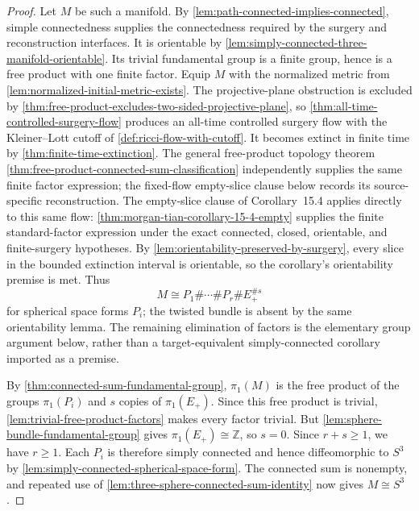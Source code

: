 \begin{proof}
Let $M$ be such a manifold.  By
\ref{lem:path-connected-implies-connected}, simple connectedness supplies the
connectedness required by the surgery and reconstruction interfaces.  It is
orientable by
\ref{lem:simply-connected-three-manifold-orientable}.  Its trivial
fundamental group is a finite group, hence is a free product with one finite
factor.  Equip $M$ with the normalized metric from
\ref{lem:normalized-initial-metric-exists}.  The projective-plane obstruction
is excluded by \ref{thm:free-product-excludes-two-sided-projective-plane}, so
  \ref{thm:all-time-controlled-surgery-flow} produces an all-time controlled
  surgery flow with the Kleiner--Lott cutoff of
  \ref{def:ricci-flow-with-cutoff}.  It becomes extinct in finite time by
  \ref{thm:finite-time-extinction}.  The general free-product topology theorem
\ref{thm:free-product-connected-sum-classification} independently supplies
the same finite factor expression; the fixed-flow empty-slice clause below
records its source-specific reconstruction.  The empty-slice clause of
Corollary~15.4
applies directly to this same flow:
\ref{thm:morgan-tian-corollary-15-4-empty} supplies the finite standard-factor
expression under the exact connected, closed, orientable, and finite-surgery
hypotheses.  By
\ref{lem:orientability-preserved-by-surgery}, every slice in the bounded
extinction interval is orientable, so the corollary's orientability premise is
met.  Thus
\[
 M\cong P_1\#\cdots\#P_r\#E_+^{\# s}
\]
for spherical space forms $P_i$; the twisted bundle is absent by the same
orientability lemma.  The remaining elimination of factors is the elementary
group argument below, rather than a target-equivalent simply-connected
corollary imported as a premise.

By \ref{thm:connected-sum-fundamental-group}, $\pi_1(M)$ is the free product
of the groups $\pi_1(P_i)$ and $s$ copies of $\pi_1(E_+)$.  Since this free
product is trivial, \ref{lem:trivial-free-product-factors} makes every factor
trivial.  But \ref{lem:sphere-bundle-fundamental-group} gives
$\pi_1(E_+)\cong\mathbb Z$, so $s=0$.  Since $r+s\ge1$, we have $r\ge1$.
Each $P_i$ is therefore simply connected and hence diffeomorphic to $S^3$ by
\ref{lem:simply-connected-spherical-space-form}.  The connected sum is
nonempty, and repeated use of
\ref{lem:three-sphere-connected-sum-identity} now gives $M\cong S^3$.
\end{proof}
